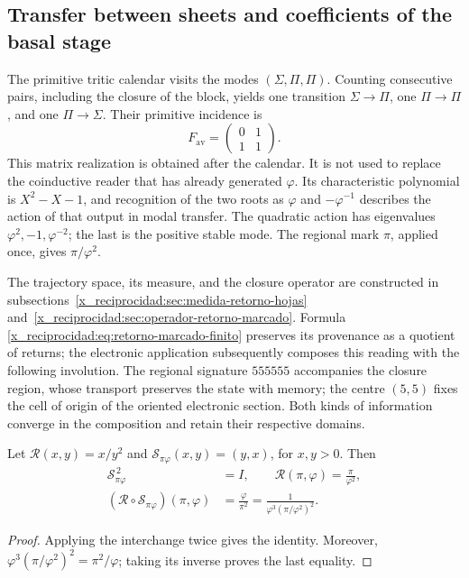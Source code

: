 

\subsection{Transfer between sheets and coefficients of the basal stage}

The primitive tritic calendar visits the modes
\((\Sigma,\Pi,\Pi)\). Counting consecutive pairs, including the
closure of the block, yields one transition \(\Sigma\to\Pi\), one
\(\Pi\to\Pi\), and one \(\Pi\to\Sigma\). Their primitive incidence is
\[
 F_{\mathrm{av}}=\begin{pmatrix}0&1\\1&1\end{pmatrix}.
\]
This matrix realization is obtained after the calendar. It is not
used to replace the coinductive reader that has already generated \(\varphi\).
Its characteristic polynomial is \(X^2-X-1\), and recognition of the
two roots as \(\varphi\) and \(-\varphi^{-1}\) describes the action of
that output in modal transfer. The quadratic action has eigenvalues
\(\varphi^2,-1,\varphi^{-2}\); the last is the positive stable mode.
The regional mark \(\pi\), applied once, gives
\(\pi/\varphi^2\).

The trajectory space, its measure, and the closure operator are
constructed in subsections~\ref{x_reciprocidad:sec:medida-retorno-hojas}
and~\ref{x_reciprocidad:sec:operador-retorno-marcado}. Formula
\eqref{x_reciprocidad:eq:retorno-marcado-finito} preserves its provenance as a quotient
of returns; the electronic application subsequently composes this reading
with the following involution. The regional signature \(555555\) accompanies
the closure region, whose transport preserves the state with memory;
the centre \((5,5)\) fixes the cell of origin of the oriented electronic
section. Both kinds of information converge in the composition and retain
their respective domains.

\begin{lemma}
Let \(\mathcal R(x,y)=x/y^2\) and \(\mathscr S_{\pi\varphi}(x,y)=(y,x)\), for \(x,y>0\).
Then
\begin{equation}
 \begin{aligned}
 \mathscr S_{\pi\varphi}^{\,2}&=I,\qquad
 \mathcal R(\pi,\varphi)=\frac{\pi}{\varphi^2},\\
 (\mathcal R\circ\mathscr S_{\pi\varphi})(\pi,\varphi)
 &=\frac{\varphi}{\pi^2}
 =\frac1{\varphi^3(\pi/\varphi^2)^2}.
 \end{aligned}
 \label{x_reciprocidad:eq:el-bisagra}
\end{equation}
\end{lemma}
\begin{proof}
Applying the interchange twice gives the identity. Moreover,
\(\varphi^3(\pi/\varphi^2)^2=\pi^2/\varphi\); taking its inverse proves
the last equality.
\end{proof}

